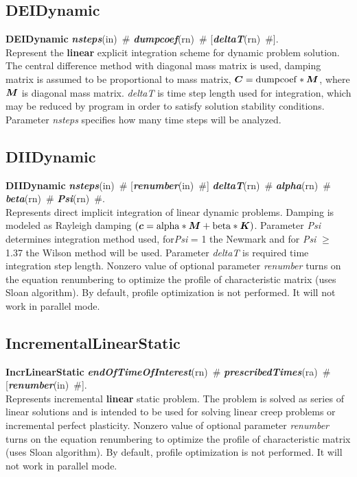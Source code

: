 \documentclass[draft]{article}
\newcommand{\mbf}[1]{\mbox{\boldmath$#1$}}
\newcommand{\param}[1]{{\em #1}}
\newcommand{\keywordnotype}[1]{\mbox{{\it{\bf{#1}}}}}
\newcommand{\keyword}[2]{\mbox{{\keywordnotype{#1}\tiny (#2)}}}
\newcommand{\entKeywordInst}[1]{\mbox{{\bf{{#1}}}}}
\newcommand{\field}[2]{\mbox{\keyword{#1}{#2}~\#}}
\newcommand{\optField}[2]{\mbox{[\field{#1}{#2}]}}
\begin{document}
\subsection{DEIDynamic}
\label{DEIDynamic}
\entKeywordInst{DEIDynamic} \field{nsteps}{in}
\field{dumpcoef}{rn} \optField{deltaT}{rn}.\\
Represent the {\bf linear} explicit
integration scheme for dynamic problem solution. The central difference method with diagonal mass matrix is used,
damping matrix is assumed to be proportional to mass matrix, $\mbf{C} = {\rm dumpcoef} * \mbf{M}$, where
$\mbf{M}$ is diagonal mass matrix. \param{deltaT} is time step length used for
integration, which may be reduced by program in order to satisfy
solution stability conditions. Parameter \param{nsteps} specifies
how many time steps will be analyzed.

\subsection{DIIDynamic}
\label{DIIDynamic}
\entKeywordInst{DIIDynamic} \field{nsteps}{in} \optField{renumber}{in}
\field{deltaT}{rn} \field{alpha}{rn} \field{beta}{rn}
\field{Psi}{rn}.\\
Represents direct implicit integration of linear dynamic
problems. Damping is modeled as Rayleigh damping $(\mbf{c} =
\rm{alpha}*\mbf{M} + \rm{beta} * \mbf{K})$. Parameter \param{Psi} determines
integration method used, for\param{Psi} = 1 the Newmark and for \param{Psi} $\ge$ 1.37 the Wilson method
will be used. Parameter \param{deltaT} is required time integration
step length.
Nonzero value of optional parameter \param{renumber} turns on the
equation renumbering to optimize the profile of characteristic matrix
(uses Sloan algorithm). By default, profile optimization is not
performed. It will not work in parallel mode.

\subsection{IncrementalLinearStatic}
\label{IncrementalLinearStatic}
\entKeywordInst{IncrLinearStatic}
\field{endOfTimeOfInterest}{rn} \field{pre\-scri\-bed\-Ti\-mes}{ra} \optField{renumber}{in}.\\
Represents incremental {\bf linear} static problem.
The problem is solved as series of linear solutions and is intended to 
be used for solving linear creep problems or incremental perfect plasticity.
Nonzero value of optional parameter \param{renumber} turns on the
equation renumbering to optimize the profile of characteristic matrix
(uses Sloan algorithm). By default, profile optimization is not
performed. It will not work in parallel mode.
\end{document}

